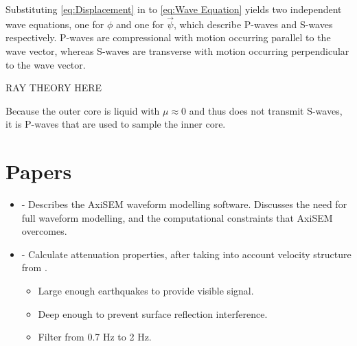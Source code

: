 \documentclass[11pt,a4paper]{article}
\begin{document}
Substituting \eqref{eq:Displacement} in to \eqref{eq:Wave Equation} yields two independent wave equations, one for $\phi$ and one for $\vec{\psi}$, which describe P-waves and S-waves respectively. P-waves are compressional with motion occurring parallel to the wave vector, whereas S-waves are transverse with motion occurring perpendicular to the wave vector.

RAY THEORY HERE

Because the outer core is liquid with $\mu \approx 0$ and thus does not transmit S-waves, it is P-waves that are used to sample the inner core.

\section{Papers}
\begin{itemize}
	\item \cite{Nissen-Meyer2014} - Describes the AxiSEM waveform modelling software. Discusses the need for full waveform modelling, and the computational constraints that AxiSEM overcomes.

	\item \cite{Waszek2013a} - Calculate attenuation properties, after taking into account velocity structure from \cite{Waszek2011a}.
\begin{itemize}
	\item Large enough earthquakes to provide visible signal.
	\item Deep enough to prevent surface reflection interference.
	\item Filter from 0.7 Hz to 2 Hz.
\end{itemize}

\end{itemize}


\end{document}
